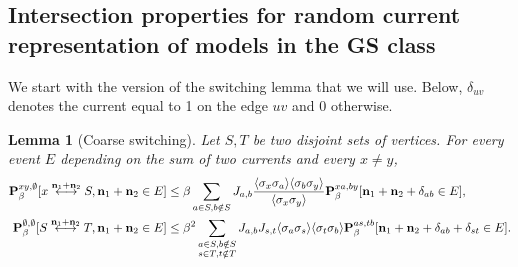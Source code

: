 \documentclass[a4paper,oneside,11pt]{article}
\newtheorem{lemma}[theorem]{Lemma}
\numberwithin{equation}{section}
\numberwithin{equation}{section}
\numberwithin{equation}{section}
\newcommand{\n}{\mathbf{n}}
\begin{document}
\subsection{Intersection properties for random current representation of models in the GS class}

We start with the version of the switching lemma that we will use. Below, $\delta_{uv}$ denotes the current equal to 1 on the edge $uv$ and 0 otherwise.

\begin{lemma}[Coarse switching]\label{prop:coarse switching}
Let $S,T$ be two disjoint sets of vertices. For every event $E$ depending on the sum of two currents and every $x\ne y$, 
\begin{align}\label{eq:ap}{\bf P}^{xy,\emptyset}_\beta[x\stackrel{\n_1+\n_2}{\longleftrightarrow}S,\n_1+\n_2\in E]&\le \beta\sum_{a\in S,b\notin S} J_{a,b}\frac{\langle\sigma_x\sigma_a\rangle\langle\sigma_b\sigma_y\rangle}{\langle\sigma_x\sigma_y\rangle}{\bf P}^{xa,by}_\beta[\n_1+\n_2+\delta_{ab}\in E],\\
\label{eq:app}{\bf P}^{\emptyset,\emptyset}_\beta[S\stackrel{\n_1+\n_2}{\longleftrightarrow}T,\n_1+\n_2\in E]&\le \beta^2\sum_{\substack{a\in S,b\notin S\\ s\in T,t\notin T}}J_{a,b}J_{s,t}\langle\sigma_a\sigma_s\rangle\langle\sigma_t\sigma_b\rangle{\bf P}^{as,tb}_\beta[\n_1+\n_2+\delta_{ab}+\delta_{st}\in E].
\end{align}
\end{lemma}
\end{document}
